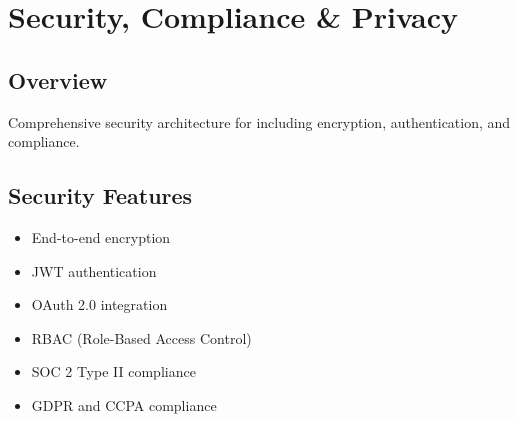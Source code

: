 \chapter{Security, Compliance \& Privacy}
\label{ch:security-compliance}

\section{Overview}
Comprehensive security architecture for \lifeos{} including encryption, authentication, and compliance.

\section{Security Features}
\begin{itemize}
    \item End-to-end encryption
    \item JWT authentication
    \item OAuth 2.0 integration
    \item RBAC (Role-Based Access Control)
    \item SOC 2 Type II compliance
    \item GDPR and CCPA compliance
\end{itemize}

